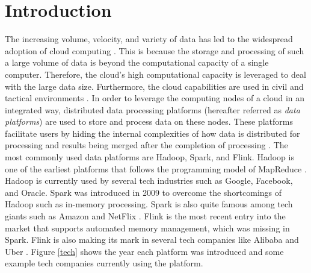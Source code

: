 \documentclass[3p]{elsarticle}
\begin{document}
%

\section{Introduction}

The increasing volume, velocity, and variety of data has led to the widespread adoption of cloud computing \cite{rimal2009taxonomy}. This is because the storage and processing of such a large volume of data is beyond the computational capacity of a single computer. Therefore, the cloud's high computational capacity is leveraged to deal with the large data size. Furthermore, the cloud capabilities are used in civil \cite{bello2021cloud, bhatt2016cloud} and tactical environments \cite{ahmad2023review, baek2021c4i}. In order to leverage the computing nodes of a cloud in an integrated way, distributed data processing platforms (hereafter referred as \textit{data platforms}) are used to store and process data on these nodes. These platforms facilitate users by hiding the internal complexities of how data is distributed for processing and results being merged after the completion of processing \cite{inoubli2018experimental}. The most commonly used data platforms are Hadoop, Spark, and Flink. Hadoop is one of the earliest platforms that follows the programming model of MapReduce \cite{dittrich2012efficient}. Hadoop is currently used by several tech industries such as Google, Facebook, and Oracle. Spark was introduced in 2009 to overcome the shortcomings of Hadoop such as in-memory processing. Spark is also quite famous among tech giants such as Amazon and NetFlix \cite{zaharia2016apache}. Flink is the most recent entry into the market that supports automated memory management, which was missing in Spark. Flink is also making its mark in several tech companies like Alibaba and Uber \cite{carbone2015apache}. Figure \ref{tech} shows the year each platform was introduced and some example tech companies currently using the platform.

\end{document}
